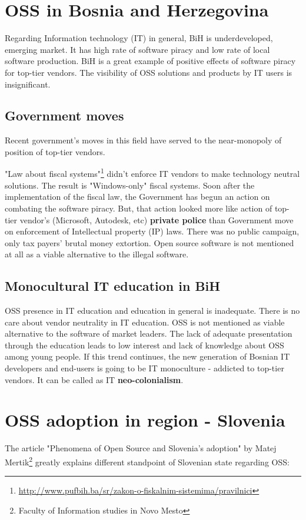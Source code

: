 \documentclass[times, utf8, seminar]{fit}
\begin{document}
\chapter{OSS in Bosnia and Herzegovina}

Regarding Information technology (IT) in general, BiH is underdeveloped, emerging market. It has high rate of software piracy and low rate of local software production. BiH is a great example of positive effects of software piracy for top-tier vendors. The visibility of OSS solutions and products by IT users is insignificant.

\section{Government moves}
Recent government’s moves in this field have served to the near-monopoly of position of top-tier vendors. 

"Law about fiscal systems"\footnote{\url{http://www.pufbih.ba/sr/zakon-o-fiskalnim-sistemima/pravilnici}} didn't enforce IT vendors to make technology neutral solutions. The result is "Windows-only" fiscal systems. Soon after the implementation of the fiscal law, the Government has begun an action on combating the software piracy. But, that action looked more like action of top-tier vendor's (Microsoft, Autodesk, etc) \textbf{private police} than Government move on enforcement of Intellectual property (IP) laws. There was no public campaign, only tax payers’ brutal money extortion. Open source software is not mentioned at all as a viable alternative to the illegal software.

\section{Monocultural IT education in BiH}
OSS presence in IT education and education in general is inadequate. There is no care about vendor neutrality in IT education. OSS is not mentioned as viable alternative to the software of market leaders. The lack of adequate presentation through the education leads to low interest and lack of knowledge about OSS among young people. If this trend continues, the new generation of Bosnian IT developers and end-users is going to be IT monoculture - addicted to top-tier vendors. It can be called as IT \textbf{neo-colonialism}.

\chapter{OSS adoption in region - Slovenia} 
The article "Phenomena of Open Source and Slovenia's adoption" by Matej Mertik\footnote{Faculty of Information studies in Novo Mesto} greatly explains different standpoint of Slovenian state regarding OSS:
  
\end{document}
